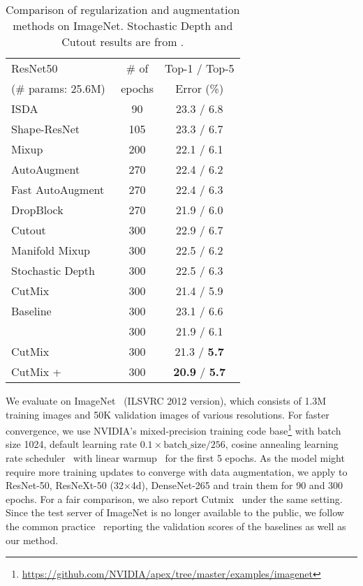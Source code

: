 \documentclass[final]{cvpr}
\begin{document}
\begin{table}[t]
    \centering
    \begin{tabular}{l|c|c}
    \toprule
    ResNet50  & \# of & Top-1 / Top-5\\
   (\# params:  25.6M) & epochs & Error (\%)\\
    \midrule
    \midrule
    ISDA~\cite{wang2019implicit} & 90 & 23.3 / 6.8 \\
    Shape-ResNet~\cite{geirhos2018imagenet} & 105 & 23.3 / 6.7 \\
    Mixup~\cite{zhang2017mixup} & 200 & 22.1 / 6.1  \\
    AutoAugment~\cite{cubuk2019autoaugment} & 270 & 22.4 / 6.2 \\
    Fast AutoAugment~\cite{lim2019fast} & 270 & 22.4 / 6.3 \\
    DropBlock~\cite{ghiasi2018dropblock} & 270 & 21.9 / 6.0 \\
    Cutout~\cite{devries2017cutout}& 300 & 22.9 / 6.7  \\ 
    Manifold Mixup~\cite{zhang2017mixup} & 300 & 22.5 / 6.2 \\
    Stochastic Depth~\cite{huang2016deep} & 300 & 22.5 / 6.3 \\ 
    CutMix~\cite{yun2019cutmix} & 300 & 21.4 / 5.9 \\
    \midrule
    Baseline & 300 & 23.1 / 6.6 \\  
    \methodname{} & 300 & 21.9 / 6.1 \\
    CutMix & 300 & 21.3 / \textbf{5.7} \\
    CutMix + \methodname{} & 300 & \textbf{20.9} / \textbf{5.7} \\
    \bottomrule
\end{tabular}
\caption{Comparison of regularization and augmentation methods on ImageNet. Stochastic Depth and Cutout results are from \cite{yun2019cutmix}.}
\label{tab:imagenet_da_result}     \vspace{-0.2in}
\end{table}

\label{subsec:imagenet}
We evaluate on ImageNet~\cite{deng2009imagenet} (ILSVRC 2012 version), which consists of 1.3M training images and 50K validation images of various resolutions. For faster convergence, we use NVIDIA's mixed-precision training code base\footnote{\href{https://github.com/NVIDIA/apex/tree/master/examples/imagenet}{https://github.com/NVIDIA/apex/tree/master/examples/imagenet}} with batch size 1024, default learning rate $0.1 \times \mbox{batch\_size} / 256$, cosine annealing learning rate scheduler~\cite{loshchilov2016sgdr} with linear warmup~\cite{goyal2017accurate} for the first 5 epochs. 
As the model might require more training updates to converge with data augmentation, we apply \methodname{} to ResNet-50, ResNeXt-50 (32$\times$4d), DenseNet-265 and train them for 90 and 300 epochs. For a fair comparison, we also report Cutmix~\cite{yun2019cutmix} under the same setting.
Since the test server of ImageNet is no longer available to the public, we follow the common practice~\cite{xie2017aggregated,huang2017densely,zhang2017mixup,yun2019cutmix,ghiasi2018dropblock} reporting the validation scores of the baselines as well as our method.
\end{document}
